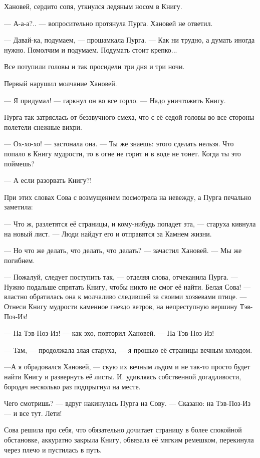 \documentclass[oneside,final,14pt]{extreport}
\begin{document}
	Хановей, сердито сопя, уткнулся ледяным носом в Книгу.
	
	— А-а-а?.. — вопросительно протянула Пурга. Хановей не ответил.
	
	— Давай-ка, подумаем, — прошамкала Пурга. — Как ни трудно, а думать иногда нужно. Помолчим и подумаем. Подумать стоит крепко...
	
	Все потупили головы и так просидели три дня и три ночи.
	
	Первый нарушил молчание Хановей.
	
	— Я придумал! — гаркнул он во все горло. — Надо уничтожить Книгу.
	
	Пурга так затряслась от беззвучного смеха, что с её седой головы во все стороны полетели снежные вихри.
	
	— Ох-хо-хо! — застонала она. — Ты же знаешь: этого сделать нельзя. Что попало в Книгу мудрости, то в огне не горит и в воде не тонет. Когда ты это поймешь?
	
	— А если разорвать Книгу?!
	
	При этих словах Сова с возмущением посмотрела на невежду, а Пурга печально заметила:
	
	— Что ж, разлетятся её страницы, и кому-нибудь попадет эта, — старуха кивнула на новый лист. — Люди найдут его и отправятся за Камнем жизни.
	
	— Но что же делать, что делать, что делать? — зачастил Хановей. — Мы же погибнем.
	
	— Пожалуй, следует поступить так, — отделяя слова, отчеканила Пурга. — Нужно подальше спрятать Книгу, чтобы никто не смог её найти. Белая Сова! — властно обратилась она к молчаливо следившей за своими хозяевами птице. — Отнеси Книгу мудрости каменное гнездо ветров, на непреступную вершину Тэв-Поз-Из!
	
	— На Тэв-Поз-Из! — как эхо, повторил Хановей. — На Тэв-Поз-Из!
	
	— Там, — продолжала злая старуха, — я прошью её страницы вечным холодом.
	
	—А я обрадовался Хановей, — скую их вечным льдом и не так-то просто будет найти Книгу и развернуть её листы. И. удивляясь собственной догадливости, бородач несколько раз подпрыгнул на месте.
	
	Чего смотришь? — вдруг накинулась Пурга на Сову. — Сказано: на Тэв-Поз-Из — и все тут. Лети!
	
	Сова решила про себя, что обязательно дочитает страницу в более спокойной обстановке, аккуратно закрыла Книгу, обвязала её мягким ремешком, перекинула через плечо и пустилась в путь.
\end{document}
